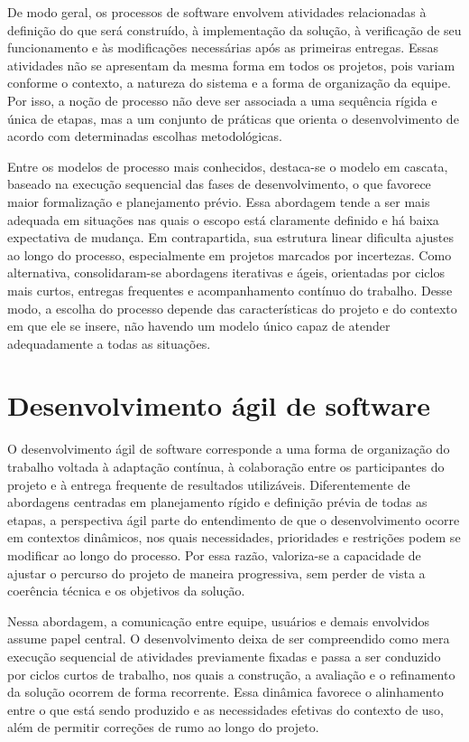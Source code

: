 \documentclass[grad,pdftex]{poli}
\begin{document}
De modo geral, os processos de software envolvem atividades relacionadas à definição do que será construído,  à implementação da solução, à verificação de seu funcionamento e às modificações necessárias após as primeiras entregas. Essas atividades não se apresentam da mesma forma em todos os projetos, pois variam conforme o contexto, a natureza do sistema e a forma de organização da equipe. Por isso, a noção de processo não deve ser associada a uma sequência rígida e única de etapas, mas a um conjunto de práticas que orienta o desenvolvimento de acordo com determinadas escolhas metodológicas.

Entre os modelos de processo mais conhecidos, destaca-se o modelo em cascata, baseado na execução sequencial das fases de desenvolvimento, o que favorece maior formalização e planejamento prévio. Essa abordagem tende a ser mais adequada em situações nas quais o escopo está claramente definido e há baixa expectativa de mudança. Em contrapartida, sua estrutura linear dificulta ajustes ao longo do processo, especialmente em projetos marcados por incertezas. Como alternativa, consolidaram-se abordagens iterativas e ágeis, orientadas por ciclos mais curtos, entregas frequentes e acompanhamento contínuo do trabalho. Desse modo, a escolha do processo depende das características do projeto e do contexto em que ele se insere, não havendo um modelo único capaz de atender adequadamente a todas as situações.

\section{Desenvolvimento ágil de software}

O desenvolvimento ágil de software corresponde a uma forma de organização do trabalho voltada à adaptação contínua, à colaboração entre os participantes do projeto e à entrega frequente de resultados utilizáveis. Diferentemente de abordagens centradas em planejamento rígido e definição prévia de todas as etapas, a perspectiva ágil parte do entendimento de que o desenvolvimento ocorre em contextos dinâmicos, nos quais necessidades, prioridades e restrições podem se modificar ao longo do processo. Por essa razão, valoriza-se a capacidade de ajustar o percurso do projeto de maneira progressiva, sem perder de vista a coerência técnica e os objetivos da solução.

Nessa abordagem, a comunicação entre equipe, usuários e demais envolvidos assume papel central. O desenvolvimento deixa de ser compreendido como mera execução sequencial de atividades previamente fixadas e passa a ser conduzido por ciclos curtos de trabalho, nos quais a construção, a avaliação e o refinamento da solução ocorrem de forma recorrente. Essa dinâmica favorece o alinhamento entre o que está sendo produzido e as necessidades efetivas do contexto de uso, além de permitir correções de rumo ao longo do projeto.
\end{document}

